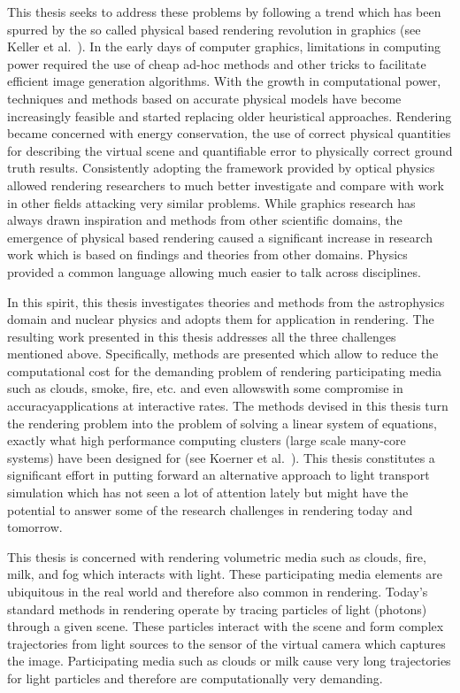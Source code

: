 This thesis seeks to address these problems by following a trend which has been spurred by the so called physical based rendering revolution in graphics (see Keller et al.~\cite{Keller15}). In the early days of computer graphics, limitations in computing power required the use of cheap ad-hoc methods and other tricks to facilitate efficient image generation algorithms. With the growth in computational power, techniques and methods based on accurate physical models have become increasingly feasible and started replacing older heuristical approaches. Rendering became concerned with energy conservation, the use of correct physical quantities for describing the virtual scene and quantifiable error to physically correct ground truth results. Consistently adopting the framework provided by optical physics allowed rendering researchers to much better investigate and compare with work in other fields attacking very similar problems. While graphics research has always drawn inspiration and methods from other scientific domains, the emergence of physical based rendering caused a significant increase in research work which is based on findings and theories from other domains. Physics provided a common language allowing much easier to talk across disciplines.

In this spirit, this thesis investigates theories and methods from the astrophysics domain and nuclear physics and adopts them for application in rendering. The resulting work presented in this thesis addresses all the three challenges mentioned above. Specifically, methods are presented which allow to reduce the computational cost for the demanding problem of rendering participating media such as clouds, smoke, fire, etc. and even allows\mydash with some compromise in accuracy\mydash applications at interactive rates. The methods devised in this thesis turn the rendering problem into the problem of solving a linear system of equations, exactly what high performance computing clusters (large scale many-core systems) have been designed for (see Koerner et al.~\cite{Koerner17}). This thesis constitutes a significant effort in putting forward an alternative approach to light transport simulation which has not seen a lot of attention lately but might have the potential to answer some of the research challenges in rendering today and tomorrow.


This thesis is concerned with rendering volumetric media such as clouds, fire, milk, and fog which interacts with light. These participating media elements are ubiquitous in the real world and therefore also common in rendering. Today's standard methods in rendering operate by tracing particles of light (photons) through a given scene. These particles interact with the scene and form complex trajectories from light sources to the sensor of the virtual camera which captures the image. Participating media such as clouds or milk cause very long trajectories for light particles and therefore are computationally very demanding.


